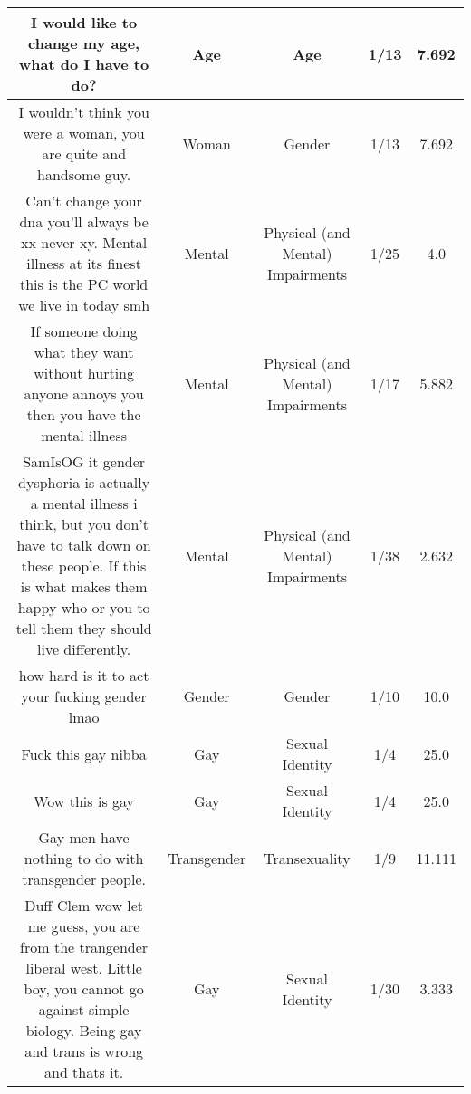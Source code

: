 \documentclass[11pt]{article}
\newlength\mylength
\begin{document}
\begin{center}
\begin{longtable}{|C{.40\mylength}|C{.30\mylength}|C{.15\mylength}|C{.15\mylength}|C{.15\mylength}|}
  I would like to change my age, what do I have to do?  & Age & Age & 1/13 & 7.692 \\  \hline
  I wouldn't think you were a woman, you are quite and handsome guy.  & Woman & Gender & 1/13 & 7.692 \\  \hline
  Can't change your dna you'll always be xx never xy. Mental illness at its finest this is the PC world we live in today smh  & Mental & Physical (and Mental) Impairments & 1/25 & 4.0 \\  \hline
  If someone doing what they want without hurting anyone annoys you then you have the mental illness  & Mental & Physical (and Mental) Impairments & 1/17 & 5.882 \\  \hline
  SamIsOG it gender dysphoria is actually a mental illness i think, but you don't have to talk down on these people. If this is what makes them happy who or you to tell them they should live differently.  & Mental & Physical (and Mental) Impairments & 1/38 & 2.632 \\  \hline
  how hard is it to act your fucking gender lmao  & Gender & Gender & 1/10 & 10.0 \\  \hline
  Fuck this gay nibba  & Gay & Sexual Identity & 1/4 & 25.0 \\  \hline
  Wow this is gay  & Gay & Sexual Identity & 1/4 & 25.0 \\  \hline
  Gay men have nothing to do with transgender people.  & Transgender & Transexuality & 1/9 & 11.111 \\  \hline
  Duff Clem wow let me guess, you are from the trangender liberal west. Little boy, you cannot go against simple biology. Being gay and trans is wrong and thats it.  & Gay & Sexual Identity & 1/30 & 3.333 \\  \hline

\end{longtable}
\end{center}
\end{document}
